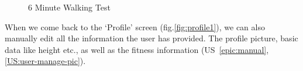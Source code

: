 \begin{figure}[h!]
    \centering
    \hfill
    \caption{6 Minute Walking Test}
    \label{fig:6mwt}
\end{figure}

When we come back to the `Profile' screen (fig.\ref{fig:profile1}), we can also manually edit all the information the user has provided.
The profile picture, basic data like height etc., as well as the fitness information (US~\ref{epic:manual}, \ref{US:user-manage-pic}).

